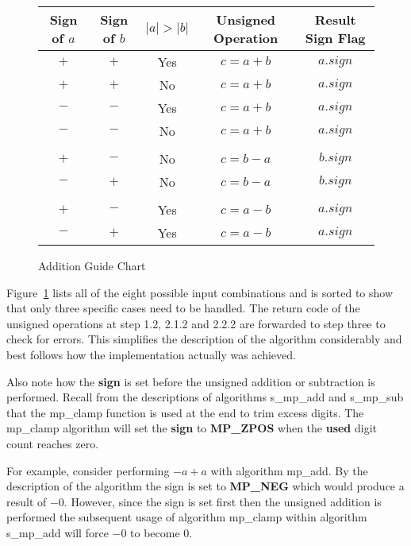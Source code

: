 \documentclass[b5paper]{book}
\begin{document}
\begin{figure}[here]
\begin{small}
\begin{center}
\begin{tabular}{|c|c|c|c|c|}
\hline \textbf{Sign of $a$} & \textbf{Sign of $b$} & \textbf{$\vert a \vert > \vert b \vert $} & \textbf{Unsigned Operation} & \textbf{Result Sign Flag} \\
\hline $+$ & $+$ & Yes & $c = a + b$ & $a.sign$ \\
\hline $+$ & $+$ & No  & $c = a + b$ & $a.sign$ \\
\hline $-$ & $-$ & Yes & $c = a + b$ & $a.sign$ \\
\hline $-$ & $-$ & No  & $c = a + b$ & $a.sign$ \\
\hline &&&&\\

\hline $+$ & $-$ & No  & $c = b - a$ & $b.sign$ \\
\hline $-$ & $+$ & No  & $c = b - a$ & $b.sign$ \\

\hline &&&&\\

\hline $+$ & $-$ & Yes & $c = a - b$ & $a.sign$ \\
\hline $-$ & $+$ & Yes & $c = a - b$ & $a.sign$ \\

\hline
\end{tabular}
\end{center}
\end{small}
\caption{Addition Guide Chart}
\label{fig:AddChart}
\end{figure}

Figure~\ref{fig:AddChart} lists all of the eight possible input combinations and is sorted to show that only three 
specific cases need to be handled.  The return code of the unsigned operations at step 1.2, 2.1.2 and 2.2.2 are 
forwarded to step three to check for errors.  This simplifies the description of the algorithm considerably and best 
follows how the implementation actually was achieved.

Also note how the \textbf{sign} is set before the unsigned addition or subtraction is performed.  Recall from the descriptions of algorithms
s\_mp\_add and s\_mp\_sub that the mp\_clamp function is used at the end to trim excess digits.  The mp\_clamp algorithm will set the \textbf{sign}
to \textbf{MP\_ZPOS} when the \textbf{used} digit count reaches zero.

For example, consider performing $-a + a$ with algorithm mp\_add.  By the description of the algorithm the sign is set to \textbf{MP\_NEG} which would
produce a result of $-0$.  However, since the sign is set first then the unsigned addition is performed the subsequent usage of algorithm mp\_clamp 
within algorithm s\_mp\_add will force $-0$ to become $0$.  
\end{document}
